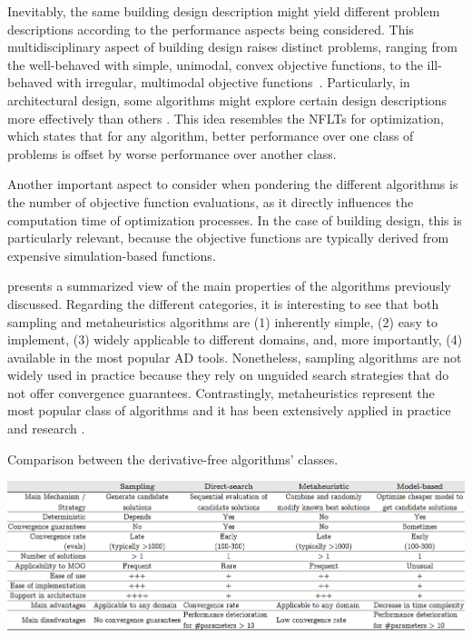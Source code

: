 	Inevitably, the same building design description might yield different problem descriptions according to the performance aspects being considered. This multidisciplinary aspect of building design raises distinct problems, ranging from the well-behaved with simple, unimodal, convex objective functions, to the ill-behaved with irregular, multimodal objective functions~\cite{Wortmann2017ADO}. Particularly, in architectural design, some algorithms might explore certain design descriptions more effectively than others%
	\cite{Wortmann2017GABESTCHOICE, Fang2017}. This idea resembles the \acp{NFLT} for optimization, which states that for any algorithm, better performance over one class of problems is offset by worse performance over another class\cite{Wolpert1997NFLT}. 
	
	Another important aspect to consider when pondering the different algorithms is the number of objective function evaluations, as it directly influences the computation time of optimization processes. In the case of building design, this is particularly relevant, because the objective functions are typically derived from expensive simulation-based functions.
		
	 presents a summarized view of the main properties of the algorithms previously discussed. Regarding the different categories, it is interesting to see that both sampling and metaheuristics algorithms are (1) inherently simple, (2) easy to implement, (3) widely applicable to different domains, and, more importantly, (4) available in the most popular \ac{AD} tools. Nonetheless, sampling algorithms are not widely used in practice because they rely on unguided search strategies that do not offer convergence guarantees. Contrastingly, metaheuristics represent the most popular class of algorithms and it has been extensively applied in practice and research \cite{Wortmann2017ADO,Waibel2018}.
	\begin{table}[hp]	
		\centering	
		\caption{Comparison between the derivative-free algorithms' classes.}	
		\includegraphics[width=1\textwidth]{tables_and_code/algorithms_comparison.PNG}
		\label{table:compare-dfo-algos}	
	\end{table}

